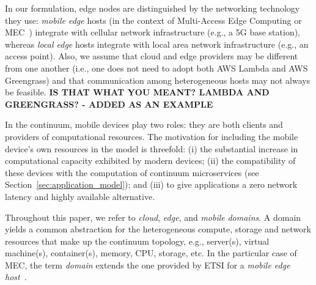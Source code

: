 %
%

In our formulation, edge nodes are distinguished by the networking technology they use: \textit{mobile edge} hosts (in the context of Multi-Access Edge Computing or MEC~\cite{etsimec16,ahmed2016isco}) integrate with cellular network infrastructure (e.g., a 5G base station), whereas \textit{local edge} hosts integrate with local area network infrastructure (e.g., an access point). Also, we assume that cloud and edge providers may be different from one another (i.e., one does not need to adopt both AWS Lambda and AWS Greengrass) and that communication among heterogeneous hosts may not always be feasible. \textbf{IS THAT WHAT YOU MEANT? LAMBDA AND GREENGRASS? - ADDED AS AN EXAMPLE}




In the continuum, mobile devices play two roles: they are both clients and providers of computational resources. The motivation for including the mobile device's own resources in the model is threefold: (i) the substantial increase in computational capacity exhibited by modern devices; (ii) the compatibility of these devices with the computation of continuum microservices (see Section~\ref{sec:application_model}); and (iii) to give applications a zero network latency and highly available alternative.%


Throughout this paper, we refer to \textit{cloud}, \textit{edge}, and \textit{mobile} \textit{domains}. 
A domain yields a common  abstraction for the heterogeneous compute, storage and network resources that make up the continuum topology, e.g., server(s), virtual machine(s), container(s), memory, CPU, storage, etc. In the particular case of MEC, the term \textit{domain} extends the one provided by ETSI for a \textit{mobile edge host}~\cite{etsimec16}.



